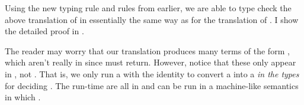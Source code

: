 Using the new typing rule and  rules from earlier, we are able
to type check the above translation of \im{\sappe{\se}{\sepr}} in essentially
the same way as for the  translation of \im{\ssnde{\se}}.
I show the detailed proof in .

The reader may worry that our   translation produces many
terms of the form \im{\cpsappe{\cpsk}{(\sappe{\se^\div}{\sA^+~\cpsidk})}}, which
aren't really in  since \im{\sappe{\se^\div}{\sA^+~\cpsidk}} must return.
However, notice that these only appear in , not .
That is, we only run a  with the identity 
to convert a   into a  \emph{in the
  types} for deciding .
The run-time  are all in  and can be run in a machine-like
semantics in which  .
